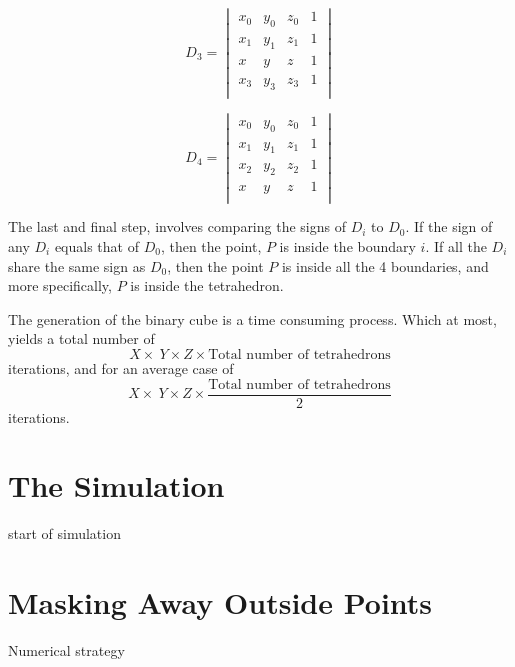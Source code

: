 \[
D_{3} =
\begin{vmatrix}
x_{0} & y_{0} & z_{0} & 1 \\ 
x_{1} & y_{1} & z_{1} & 1 \\ 
x & y & z & 1 \\ 
x_{3} & y_{3} & z_{3} & 1 \\ 
\end{vmatrix}
\]

\[
D_{4} =
\begin{vmatrix}
x_{0} & y_{0} & z_{0} & 1 \\ 
x_{1} & y_{1} & z_{1} & 1 \\ 
x_{2} & y_{2} & z_{2} & 1 \\ 
x & y & z & 1 \\ 
\end{vmatrix}
\]

The last and final step, involves comparing the signs of \(D_{i}\) to \(D_{0}\). If the sign of any \(D_{i}\) equals that of \(D_{0}\), then the point, \(P\) is inside the boundary \(i\). If all the \(D_{i}\) share the same sign as \(D_{0}\), then the point \(P\) is inside all the 4 boundaries, and more specifically, \(P\) is inside the tetrahedron.


The generation of the binary cube is a time consuming process. Which at most, yields a total number of 
\begin{equation} 
X \times\ Y \times Z  \times \textrm{Total number of tetrahedrons}
\end{equation}  
iterations, and for an average case of 
\begin{equation} 
X \times\ Y \times Z  \times \frac{\textrm{Total number of tetrahedrons}}{2}
\end{equation} 
iterations.  

\section{The Simulation}
start of simulation

\section{Masking Away Outside Points}
Numerical strategy





